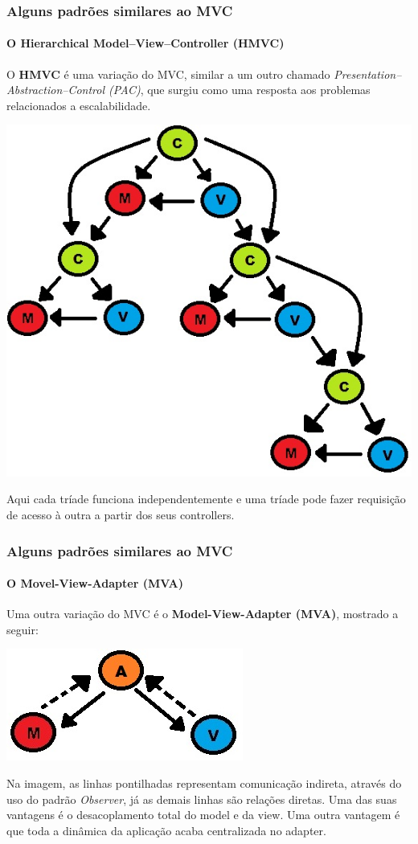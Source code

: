 \documentclass{beamer}
\begin{document}
\begin{frame}
\frametitle{Alguns padrões similares ao MVC}
\framesubtitle{O Hierarchical Model–View–Controller (HMVC)}
	O \textbf{HMVC} é uma variação do MVC, similar a um outro chamado \textit{Presentation–Abstraction–Control (PAC)}, que surgiu como uma resposta aos problemas
	relacionados a escalabilidade.
	\begin{center}
		\includegraphics[scale=0.175]{HMVC.jpg}
	\end{center}
	Aqui cada tríade funciona independentemente e uma tríade pode fazer requisição de acesso à outra a partir dos seus controllers.
\end{frame}

\begin{frame}
\frametitle{Alguns padrões similares ao MVC}
\framesubtitle{O Movel-View-Adapter (MVA)}
	Uma outra variação do MVC é o \textbf{Model-View-Adapter (MVA)}, mostrado a seguir:
	\begin{center}
		\includegraphics[scale=0.4]{MVA.jpg}
	\end{center}
	Na imagem, as linhas pontilhadas representam comunicação indireta, através do uso do padrão \textit{Observer}, já as demais linhas são relações diretas.
	Uma das suas vantagens é o desacoplamento total do model e da view. Uma outra vantagem é que toda a dinâmica da aplicação acaba centralizada no adapter.
\end{frame}
\end{document}
